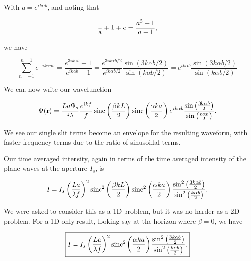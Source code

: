 {With $a = e^{i k \alpha b}$, and noting that

\begin{equation}\label{eqn:modernOptics:ProblemSet2:P1:310}
\frac{1}{a} + 1 + a = \frac{a^3 - 1}{a - 1},
\end{equation}

we have

\begin{dmath}\label{eqn:modernOptics:ProblemSet2:P1:330}
\sum_{n=-1}^{n=1}
e^{-i k \alpha n b}
=
\frac{ e^{3 i k \alpha b} - 1 }{ e^{i k \alpha b} - 1 }
=
\frac{ e^{3 i k \alpha b/2} }{ e^{i k \alpha b/2} }
\frac{ \sin( 3 k \alpha b/2 ) }{ \sin( k \alpha b/2 ) }
=
e^{i k \alpha b}
\frac{ \sin( 3 k \alpha b/2 ) }{ \sin( k \alpha b/2 ) }
\end{dmath}

We can now write our wavefunction

\begin{equation}\label{eqn:modernOptics:ProblemSet2:P1:350}
\Psi(\mathbf{r}) = \frac{L a \Psi_s}{i \lambda} \frac{e^{i k f}}{f}
\operatorname{sinc}\left( \frac{\beta k L}{2} \right)
\operatorname{sinc}\left( \frac{\alpha k a}{2} \right)
e^{i k \alpha b}
\frac{ \sin \left( \frac{3 k \alpha b}{2} \right) }{ \sin\left( \frac{k \alpha b}{2} \right) }.
\end{equation}

We see our single slit terms become an envelope for the resulting waveform, with faster frequency terms due to the ratio of sinusoidal terms.

Our time averaged intensity, again in terms of the time averaged intensity of the plane waves at the aperture $I_s$, is

\begin{equation}\label{eqn:modernOptics:ProblemSet2:P1:370}
I = I_s \left( \frac{L a}{\lambda f} \right)^2
\operatorname{sinc}^2\left( \frac{\beta k L}{2} \right)
\operatorname{sinc}^2\left( \frac{\alpha k a}{2} \right)
\frac{ \sin^2 \left( \frac{3 k \alpha b}{2} \right) }{ \sin^2\left( \frac{k \alpha b}{2} \right) }.
\end{equation}

We were asked to consider this as a 1D problem, but it was no harder as a 2D problem.  For a 1D only result, looking say at the horizon where $\beta = 0$, we have

\begin{equation}\label{eqn:modernOptics:ProblemSet2:P1:390}
\boxed{
I = I_s \left( \frac{L a}{\lambda f} \right)^2
\operatorname{sinc}^2\left( \frac{\alpha k a}{2} \right)
\frac{ \sin^2 \left( \frac{3 k \alpha b}{2} \right) }{ \sin^2\left( \frac{k \alpha b}{2} \right) }.
}
\end{equation}

}
